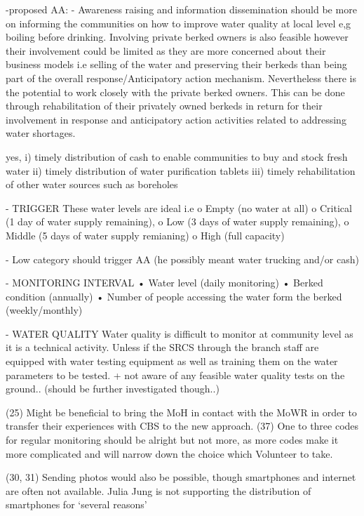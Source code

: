 -proposed AA:
-	Awareness raising and information dissemination should be more on informing the communities on how to improve water quality at local level e,g boiling before drinking. Involving private berked owners is also feasible however their involvement could be limited as they are more concerned about their business models i.e selling of the water and preserving their berkeds than being part of the overall response/Anticipatory action mechanism. Nevertheless there is the potential to work closely with the private berked owners. This can be done through rehabilitation of their privately owned berkeds in return for their involvement in response and anticipatory action activities related to addressing water shortages.

yes, i) timely distribution of cash to enable communities to buy and stock fresh water
ii) timely distribution of water purification tablets
iii) timely rehabilitation of other water sources such as boreholes

- TRIGGER
These water levels are ideal i.e 
o	Empty (no water at all) 
o	Critical (1 day of water supply remaining), 
o	Low (3 days of water supply remaining), 
o	Middle (5 days of water supply remianing) 
o	High (full capacity)

-	Low category should trigger AA (he possibly meant water trucking and/or cash)

- MONITORING INTERVAL
•	Water level (daily monitoring)
•	Berked condition (annually)
•	Number of people accessing the water form the berked (weekly/monthly)

- WATER QUALITY
Water quality is difficult to monitor at community level as it is a technical activity. Unless if the SRCS through the branch staff are equipped with water testing equipment as well as training them on the water parameters to be tested.
+ not aware of any feasible water quality tests on the ground.. (should be further investigated though..)



(25) Might be beneficial to bring the MoH in contact with the MoWR in order to transfer their experiences with CBS to the new approach.
(37) One to three codes for regular monitoring should be alright but not more, as more codes make it more complicated and will narrow down the choice which Volunteer to take. 

(30, 31) Sending photos would also be possible, though smartphones and internet are often not available. Julia Jung is not supporting the distribution of smartphones for ‘several reasons’

